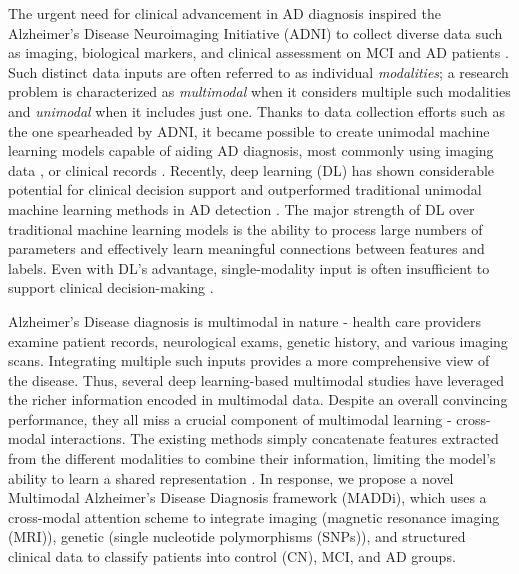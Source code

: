 \documentclass[11pt]{article}
\begin{document}
The urgent need for clinical advancement in AD diagnosis inspired the Alzheimer’s Disease Neuroimaging Initiative (ADNI) to collect diverse data such as imaging, biological markers, and clinical assessment on MCI and AD patients \cite{mueller2005ways}. Such distinct data inputs are often referred to as individual \textit{modalities}; a research problem is characterized as \textit{multimodal} when it considers multiple such modalities and \textit{unimodal} when it includes just one. Thanks to data collection efforts such as the one spearheaded by ADNI, it became possible to create unimodal machine learning models capable of aiding AD diagnosis, most commonly using imaging data \cite{forouzannezhad2020gaussian, uysal2020hippocampal, dimitriadis2018random, beheshti2017classification, dyrba2015predicting}, or clinical records \cite{el2021alzheimer, zhou2013modeling}. Recently, deep learning (DL) has shown considerable potential for clinical decision support and outperformed traditional unimodal machine learning methods in AD detection \cite{WANG2019145, UYSAL2020108669, KRUTHIKA201934}. The major strength of DL over traditional machine learning models is the ability to process large numbers of parameters and effectively learn meaningful connections between features and labels. Even with DL's advantage, single-modality input is often insufficient to support clinical decision-making \cite{stahlschmidt2022multimodal}. 
  
Alzheimer's Disease diagnosis is multimodal in nature - health care providers examine patient records, neurological exams, genetic history, and various imaging scans. Integrating multiple such inputs provides a more comprehensive view of the disease. Thus, several deep learning-based multimodal studies \cite{ELSAPPAGH2020197,ABUHMED2021106688,BUCHOLC2019157,venugopalan2021multimodal} have leveraged the richer information encoded in multimodal data. Despite an overall convincing performance, they all miss a crucial component of multimodal learning - cross-modal interactions. The existing methods simply concatenate features extracted from the different modalities to combine their information, limiting the model's ability to learn a shared representation \cite{ngiam2011multimodal}. In response, we propose a novel Multimodal Alzheimer's Disease Diagnosis framework (MADDi), which uses a cross-modal attention scheme \cite{Tan2019LXMERTLC} to integrate imaging (magnetic resonance imaging (MRI)), genetic (single nucleotide polymorphisms (SNPs)), and structured clinical data to classify patients into control (CN), MCI, and AD groups. 
\end{document}
